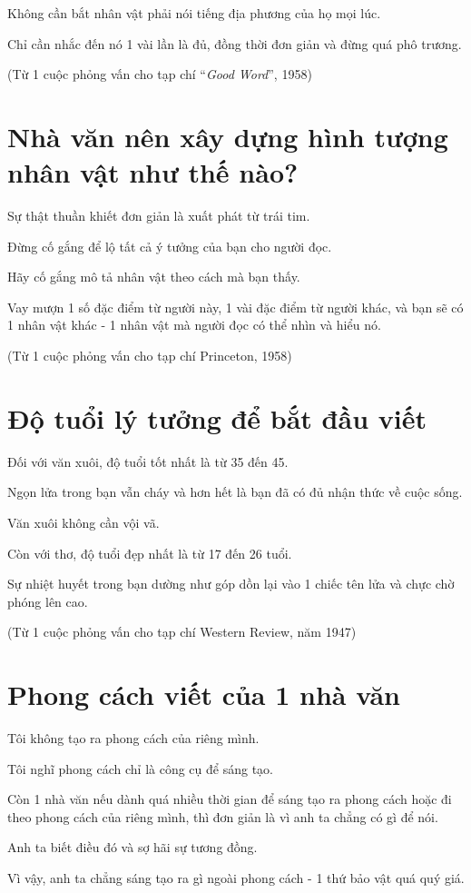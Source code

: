 \documentclass{book}
\numberwithin{equation}{section}
\begin{document}
Không cần bắt nhân vật phải nói tiếng địa phương của họ mọi lúc.

Chỉ cần nhắc đến nó 1 vài lần là đủ, đồng thời đơn giản và đừng quá phô trương.

(Từ 1 cuộc phỏng vấn cho tạp chí ``\textit{Good Word}'', 1958)

\section{Nhà văn nên xây dựng hình tượng nhân vật như thế nào?}
Sự thật thuần khiết đơn giản là xuất phát từ trái tim.

Đừng cố gắng để lộ tất cả ý tưởng của bạn cho người đọc.

Hãy cố gắng mô tả nhân vật theo cách mà bạn thấy.

Vay mượn 1 số đặc điểm từ người này, 1 vài đặc điểm từ người khác, và bạn sẽ có 1 nhân vật khác - 1 nhân vật mà người đọc có thể nhìn và hiểu nó.

(Từ 1 cuộc phỏng vấn cho tạp chí Princeton, 1958)

\section{Độ tuổi lý tưởng để bắt đầu viết}
Đối với văn xuôi, độ tuổi tốt nhất là từ 35 đến 45.

Ngọn lửa trong bạn vẫn cháy và hơn hết là bạn đã có đủ nhận thức về cuộc sống.

Văn xuôi không cần vội vã.

Còn với thơ, độ tuổi đẹp nhất là từ 17 đến 26 tuổi.

Sự nhiệt huyết trong bạn dường như góp dồn lại vào 1 chiếc tên lửa và chực chờ phóng lên cao.

(Từ 1 cuộc phỏng vấn cho tạp chí Western Review, năm 1947)

\section{Phong cách viết của 1 nhà văn}
Tôi không tạo ra phong cách của riêng mình.

Tôi nghĩ phong cách chỉ là công cụ để sáng tạo.

Còn 1 nhà văn nếu dành quá nhiều thời gian để sáng tạo ra phong cách hoặc đi theo phong cách của riêng mình, thì đơn giản là vì anh ta chẳng có gì để nói.

Anh ta biết điều đó và sợ hãi sự tương đồng.

Vì vậy, anh ta chẳng sáng tạo ra gì ngoài phong cách - 1 thứ bảo vật quá quý giá.
\end{document}
